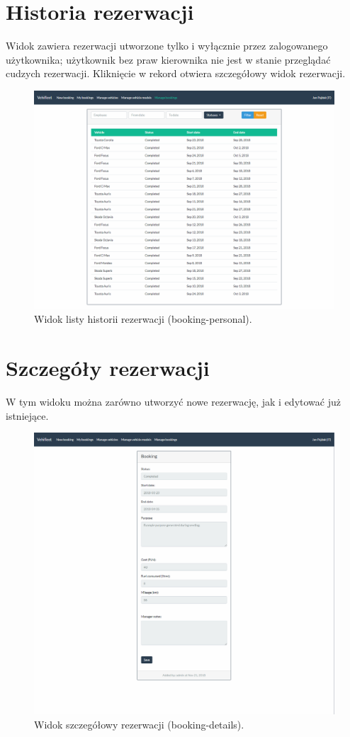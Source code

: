 \documentclass[eng,printmode,openany]{mgr}
\begin{document}
	\section{Historia rezerwacji}
	Widok zawiera rezerwacji utworzone tylko i wyłącznie przez zalogowanego użytkownika; użytkownik bez praw kierownika nie jest w stanie przeglądać cudzych rezerwacji. Kliknięcie w rekord otwiera szczegółowy widok rezerwacji.
	\begin{figure}[H]
		\centering
		\includegraphics[width=\textwidth]{images/views/booking-list-manage.png}
		\caption{Widok listy historii rezerwacji (booking-personal).}	
	\end{figure}
	
	\newpage
	\section{Szczegóły rezerwacji}
	W tym widoku można zarówno utworzyć nowe rezerwację, jak i edytować już istniejące.
	\begin{figure}[H]
		\centering
		\includegraphics[width=\textwidth]{images/views/booking-detail.png}
		\caption{Widok szczegółowy rezerwacji (booking-details).} 		
	\end{figure}
\end{document}
